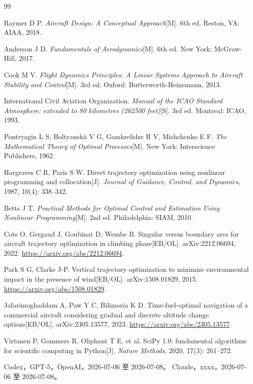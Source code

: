 \documentclass[withoutpreface,bwprint]{cumcmthesis}
\begin{document}
\newpage
\begin{thebibliography}{99}

 Raymer D P. \emph{Aircraft Design: A Conceptual Approach}[M]. 6th ed. Reston, VA: AIAA, 2018.

 Anderson J D. \emph{Fundamentals of Aerodynamics}[M]. 6th ed. New York: McGraw-Hill, 2017.

 Cook M V. \emph{Flight Dynamics Principles: A Linear Systems Approach to Aircraft Stability and Control}[M]. 3rd ed. Oxford: Butterworth-Heinemann, 2013.

 International Civil Aviation Organization. \emph{Manual of the ICAO Standard Atmosphere: extended to 80 kilometres (262500 feet)}[S]. 3rd ed. Montreal: ICAO, 1993.

 Pontryagin L S, Boltyanskii V G, Gamkrelidze R V, Mishchenko E F. \emph{The Mathematical Theory of Optimal Processes}[M]. New York: Interscience Publishers, 1962.

 Hargraves C R, Paris S W. Direct trajectory optimization using nonlinear programming and collocation[J]. \emph{Journal of Guidance, Control, and Dynamics}, 1987, 10(4): 338--342.

 Betts J T. \emph{Practical Methods for Optimal Control and Estimation Using Nonlinear Programming}[M]. 2nd ed. Philadelphia: SIAM, 2010.

 Cots O, Gergaud J, Goubinat D, Wembe B. Singular versus boundary arcs for aircraft trajectory optimization in climbing phase[EB/OL]. arXiv:2212.06694, 2022. \url{https://arxiv.org/abs/2212.06694}.

 Park S G, Clarke J-P. Vertical trajectory optimization to minimize environmental impact in the presence of wind[EB/OL]. arXiv:1508.01829, 2015. \url{https://arxiv.org/abs/1508.01829}.

 Jafarimoghaddam A, Paw Y C, Bilimoria K D. Time-fuel-optimal navigation of a commercial aircraft considering gradual and discrete altitude change options[EB/OL]. arXiv:2305.13577, 2023. \url{https://arxiv.org/abs/2305.13577}.

 Virtanen P, Gommers R, Oliphant T E, et al. SciPy 1.0: fundamental algorithms for scientific computing in Python[J]. \emph{Nature Methods}, 2020, 17(3): 261--272.

 Codex，GPT-5，OpenAI，2026-07-06 至 2026-07-08。
 Claude，xxxx，2026-07-06 至 2026-07-08。


\end{thebibliography}
\end{document}

